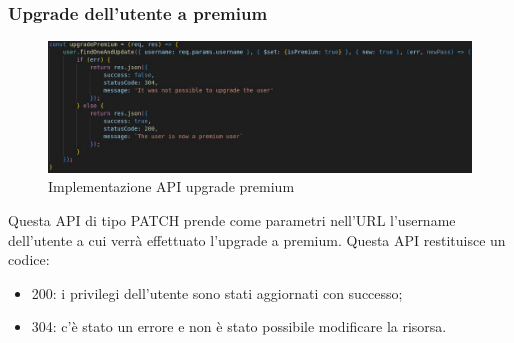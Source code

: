 \subsubsection{Upgrade dell'utente a premium}
\begin{figure}[!h]
\centering
\includegraphics[scale=0.4]{images/api_upgrade_premium.jpg}
\caption{Implementazione API upgrade premium}
\label{fig:api_upgrade_premium}
\end{figure}
\noindent
Questa API di tipo PATCH prende come parametri nell'URL l'username dell'utente a cui verrà effettuato l'upgrade a premium.
Questa API restituisce un codice:
\begin{itemize}
    \item 200: i privilegi dell'utente sono stati aggiornati con successo;
    \item 304: c'è stato un errore e non è stato possibile modificare la risorsa.
\end{itemize}

